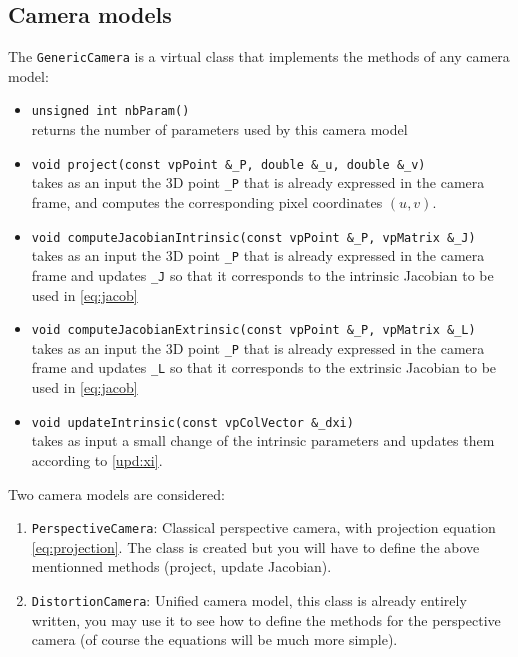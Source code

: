 \documentclass{ecnreport}
\begin{document}
\subsection{Camera models}

The \texttt{GenericCamera} is a virtual class that implements the methods of any camera model:
\begin{itemize}
 \item \texttt{unsigned int nbParam()} \\ returns the number of parameters used by this camera model
 \item \texttt{void project(const vpPoint \&\_P, double \&\_u, double \&\_v)} \\ takes as an input the 3D point \texttt{\_P} that is already expressed in the camera frame, and computes the corresponding
 pixel coordinates $(u,v)$.
    \item \texttt{void computeJacobianIntrinsic(const vpPoint \&\_P, vpMatrix \&\_J)} \\ takes as an input the 3D point \texttt{\_P} that is already expressed in the camera frame and updates \texttt{\_J} so that it corresponds to the intrinsic Jacobian to be used in \eqref{eq:jacob}
    \item \texttt{void computeJacobianExtrinsic(const vpPoint \&\_P, vpMatrix \&\_L)} \\ takes as an input the 3D point \texttt{\_P} that is already expressed in the camera frame and updates \texttt{\_L} so that it corresponds to the extrinsic Jacobian to be used in \eqref{eq:jacob}
    \item \texttt{void updateIntrinsic(const vpColVector \&\_dxi)} \\ takes as input a small change of the intrinsic parameters and updates them according to \eqref{upd:xi}.
 \end{itemize}
 

 Two camera models are considered:
 
 \begin{enumerate}
  \item  \texttt{PerspectiveCamera}: Classical perspective camera, with projection equation \eqref{eq:projection}. The class is created but you will have to define the above mentionned methods (project, update Jacobian).
  \item \texttt{DistortionCamera}: Unified camera model, this class is already entirely written, you may use it to see how to define the methods for the perspective camera (of course the equations will be much more simple).
 \end{enumerate}
 
\end{document}
